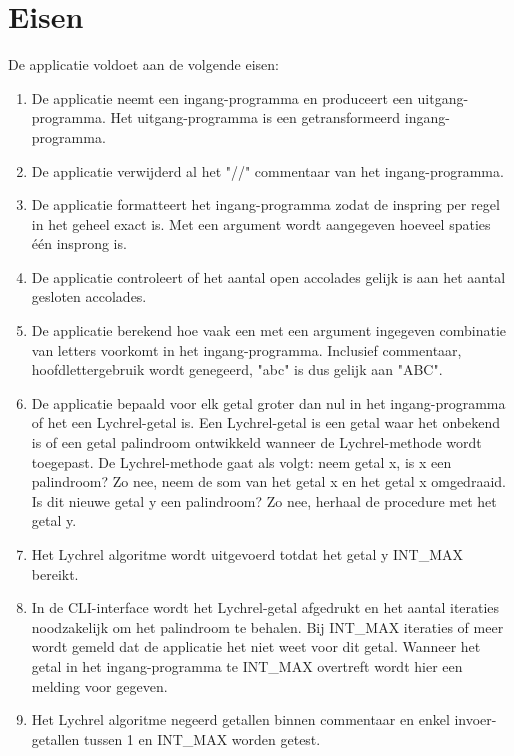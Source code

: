 \documentclass[10pt]{article}
\begin{document}
\section{Eisen}
\label{sec:eisen}
De applicatie voldoet aan de volgende eisen:
\begin{enumerate}
      \item De applicatie neemt een ingang-programma en produceert een uitgang-programma. Het uitgang-programma is een
            getransformeerd ingang-programma.
      \item De applicatie verwijderd al het "//" commentaar van het ingang-programma.
      \item De applicatie formatteert het ingang-programma zodat de inspring per regel in het geheel exact is. Met een
            argument wordt aangegeven hoeveel spaties \'e\'en insprong is.
      \item De applicatie controleert of het aantal open accolades gelijk is aan het aantal gesloten accolades.
      \item De applicatie berekend hoe vaak een met een argument ingegeven combinatie van letters voorkomt in het
            ingang-programma. Inclusief commentaar, hoofdlettergebruik wordt genegeerd, "abc" is dus gelijk aan
            "ABC".
      \item De applicatie bepaald voor elk getal groter dan nul in het ingang-programma of het een Lychrel-getal is.
            Een Lychrel-getal is een getal waar het onbekend is of een getal palindroom ontwikkeld wanneer de
            Lychrel-methode wordt
            toegepast. De Lychrel-methode gaat als volgt: neem getal x, is x een palindroom? Zo nee, neem de som van
            het getal x en
            het getal x omgedraaid. Is dit nieuwe getal y een palindroom? Zo nee, herhaal de procedure met het getal y.
      \item Het Lychrel algoritme wordt uitgevoerd totdat het getal y INT\_MAX bereikt.
      \item In de CLI-interface wordt het Lychrel-getal afgedrukt en het aantal
            iteraties
            noodzakelijk om het palindroom te behalen. Bij INT\_MAX iteraties of meer wordt gemeld dat de applicatie
            het
            niet weet voor dit
            getal. Wanneer het getal in het ingang-programma te INT\_MAX overtreft wordt hier een melding voor gegeven.
      \item Het Lychrel algoritme negeerd getallen binnen commentaar en enkel invoer-getallen tussen 1 en INT\_MAX
            worden getest.

\end{enumerate}
\end{document}
